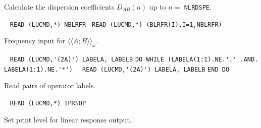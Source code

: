 \begin{description}
   Calculate the dispersion coefficients 
   $D_{AB}(n)$ up to $n = $ \verb+NLRDSPE+.
%
\item[\Key{FREQUE}] \verb| |\newline
   \verb|READ (LUCMD,*) NBLRFR |\newline
   \verb|READ (LUCMD,*) (BLRFR(I),I=1,NBLRFR)|

Frequency input for $\langle\langle A;B \rangle\rangle_{\omega}$.
 
%
%
%
\item[\Key{OPERAT}] \verb| |\newline
   \verb|READ (LUCMD,'(2A)') LABELA, LABELB|\newline
   \verb|DO WHILE (LABELA(1:1).NE.'.' .AND. LABELA(1:1).NE.'*')|\newline
   \verb|  READ (LUCMD,'(2A)') LABELA, LABELB|\newline
   \verb|END DO|

Read pairs of operator labels. 
 
\item[\Key{PRINT}] \verb| |\newline
   \verb|READ (LUCMD,*) IPRSOP|

   Set print level for linear response output.
 
\end{description}
